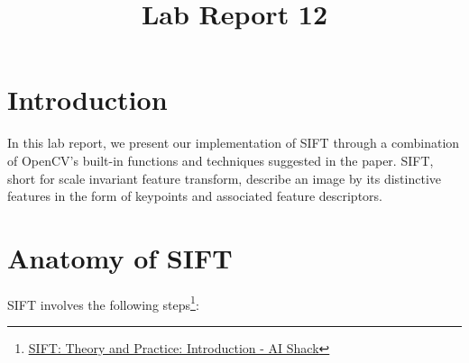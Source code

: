 \documentclass{ee208report}
\title{Lab Report 12}
\begin{document}
\begin{CJK}{UTF8}{gbsn}
    \maketitle
\end{CJK}

\begin{multicols*}{2}

\section{Introduction}

In this lab report, we present our implementation of
SIFT\cite{lowe2004distinctive} through a combination of OpenCV's built-in
functions and techniques suggested in the paper. SIFT, short for scale invariant
feature transform, describe an image by its distinctive features in the form of
keypoints and associated feature descriptors.

\section{Anatomy of SIFT}

SIFT involves the following steps\footnote{\underline{\href{http://aishack.in/
tutorials/sift-scale-invariant-feature-transform-introduction/}{SIFT: Theory and
Practice: Introduction - AI Shack}}}:


\end{multicols*}
\end{document}
